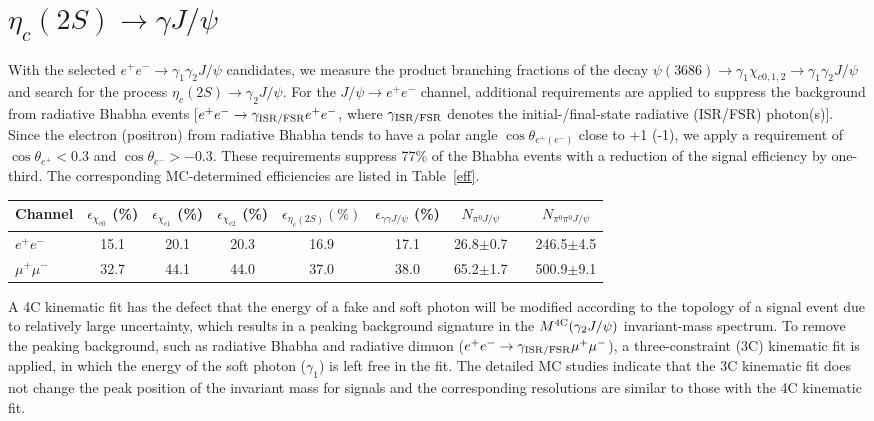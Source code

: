 \documentclass[prd,twocolumn,showpacs,amsmath,amssymb]{revtex4-1}
\begin{document}
\section{ $\eta_{c}(2S)\to\gamma J/\psi$ }

With the selected $e^{+}e^{-}\rightarrow\gamma_{1}\gamma_{2}J/\psi$ candidates, we measure the product branching fractions of the decay
$\psi(3686)\rightarrow\gamma_{1}\chi_{c0,1,2}\to\gamma_1\gamma_2 J/\psi$ and search for the process $\eta_{c}(2S)\rightarrow\gamma_{2}J/\psi$.
For the $J/\psi\rightarrow e^{+}e^{-}$ channel, additional requirements are applied to suppress the background from
radiative Bhabha events [$e^{+}e^{-}\rightarrow\gamma_{\rm ISR/FSR} e^{+}e^{-}$, where $\gamma_{\rm ISR/FSR}$ denotes the initial-/final-state radiative (ISR/FSR) photon(s)].
Since the electron (positron) from radiative Bhabha tends to have a polar angle $\cos\theta_{e^{+}(e^{-})}$ close to +1 (-1), we
apply a requirement of $\cos\theta_{e^{+}} < 0.3$ and $\cos\theta_{e^{-}} > -0.3$.
These requirements suppress 77\% of the Bhabha events with a reduction of the signal efficiency by one-third.
The corresponding MC-determined efficiencies are listed in Table~\ref{eff}.

\begin{table*}[!htbp]
\centering
  \caption{\label{eff}Detection efficiencies ($\epsilon$) for channels of $\psi(3686)\to\gamma\chi_{c0,1,2},\gamma\eta_c(2S),\gamma\gamma J/\psi$ and
  the number ($N$) of estimated background for channels $\psi(3686)\to\pi^0 J/\psi, \pi^0\pi^0 J/\psi$ scaled by the decay branching fraction and the total $\psi(3686)$ number.
  }
\begin{tabular}{lcccccccc}
\hline
Channel          & $\epsilon_{\chi_{c0}}$ (\%) & $\epsilon_{\chi_{c1}}$ (\%) & $\epsilon_{\chi_{c2}}$ (\%) & $\epsilon_{\eta_{c}(2S)} (\%)$ & $\epsilon_{\gamma\gamma J/\psi}$ (\%)& $N_{\pi^{0}J/\psi}$ && $N_{\pi^{0}\pi^{0}J/\psi}$\\
\hline
$e^{+}e^{-}$     &  15.1    &  20.1    &  20.3     &  16.9    & 17.1 & 26.8$\pm$0.7  && 246.5$\pm$4.5 \\
$\mu^{+}\mu^{-}$ &  32.7    &  44.1    &  44.0     &  37.0    & 38.0 & 65.2$\pm$1.7  && 500.9$\pm$9.1 \\
\hline
\end{tabular}
\end{table*}

A 4C kinematic fit has the defect that the energy of a fake and soft photon will be modified according to the topology of a signal event due to relatively large uncertainty, which results in a
peaking background signature in the $M^{\rm 4C}(\gamma_{2}J/\psi)$ invariant-mass spectrum.
To remove the peaking background, such as radiative Bhabha and radiative dimuon ($e^+e^-\to\gamma_{\rm ISR/FSR}\mu^+\mu^-$), a three-constraint (3C) kinematic fit is applied, in which
the energy of the soft photon ($\gamma_1$) is left free in the fit.
The detailed MC studies indicate that the 3C kinematic fit does not change the peak position of the invariant mass for signals and the corresponding resolutions are similar to those with the 4C kinematic fit.
\end{document}
